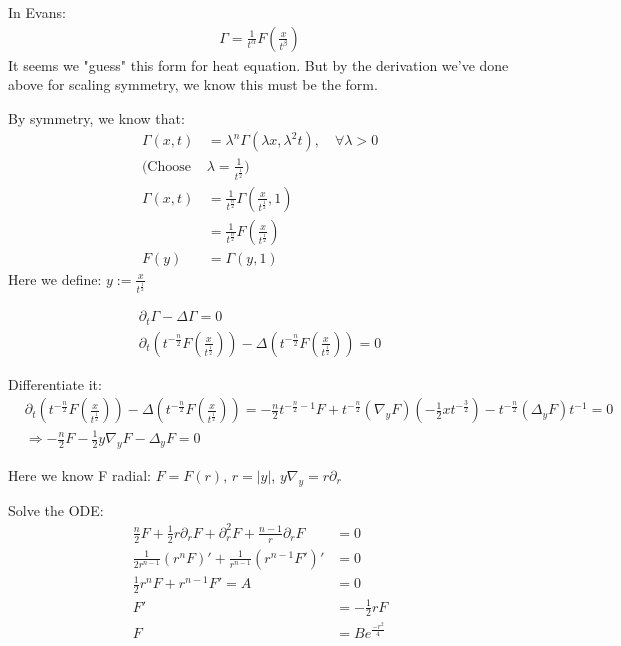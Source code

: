 \documentclass[11pt]{article}
\begin{document}
In Evans:
\begin{align*}
    \Gamma = \frac{1}{t^{\alpha}}F(\frac{x}{t^{\beta}})
\end{align*}
It seems we "guess" this form for heat equation. But by the derivation we've done above for 
scaling symmetry, we know this must be the form.

By symmetry, we know that:
\begin{align*}
    \Gamma(x,t) &= \lambda^{n} \Gamma(\lambda x, \lambda^{2} t), \quad \forall \lambda > 0\\
    (\text{Choose } &\lambda = \frac{1}{t^{\frac{1}{2}}})\\
    \Gamma(x,t) &= \frac{1}{t^{\frac{n}{2}}}\Gamma(\frac{x}{t^{\frac{1}{2}}}, 1)\\
    &= \frac{1}{t^{\frac{n}{2}}}F(\frac{x}{t^{\frac{1}{2}}}) \\
    F(y) &= \Gamma(y,1)
\end{align*}
Here we define: $y := \frac{x}{t^{\frac{1}{2}}}$

\begin{equation}
    \begin{aligned}
        \partial_{t}\Gamma - \Delta \Gamma = 0 \\
        \partial_{t}(t^{-\frac{n}{2}} F(\frac{x}{t^{\frac{1}{2}}}))
        - \Delta(t^{-\frac{n}{2}}F(\frac{x}{t^{\frac{1}{2}}})) = 0
    \end{aligned}
\end{equation}

Differentiate it:
\begin{align*}
    &\partial_{t}(t^{-\frac{n}{2}} F(\frac{x}{t^{\frac{1}{2}}}))
        - \Delta(t^{-\frac{n}{2}}F(\frac{x}{t^{\frac{1}{2}}})) 
    = -\frac{n}{2}t^{-\frac{n}{2} - 1}F + t^{-\frac{n}{2}}(\nabla_{y}F)(-\frac{1}{2}xt^{-\frac{3}{2}})
    - t^{-\frac{n}{2}}(\Delta_{y}F)t^{-1} = 0\\
    &\Longrightarrow -\frac{n}{2}F - \frac{1}{2}y \nabla_{y}F - \Delta_{y}F = 0
\end{align*}

Here we know F radial: $F = F(r),\, r= |y|$, $y \nabla_{y} = r\partial_{r}$

Solve the ODE:
\begin{align*}
    \frac{n}{2}F +\frac{1}{2}r \partial_{r}F + \partial_{r}^{2}F + \frac{n-1}{r}\partial_{r}F &= 0\\
    \frac{1}{2r^{n-1}}(r^{n}F)' + \frac{1}{r^{n-1}}(r^{n-1}F')' &= 0\\
    \frac{1}{2}r^{n}F + r^{n-1}F' = A &= 0\\
    F' &= -\frac{1}{2}rF\\
    F &= Be^{\frac{-r^{2}}{4}}
\end{align*}
\end{document}
